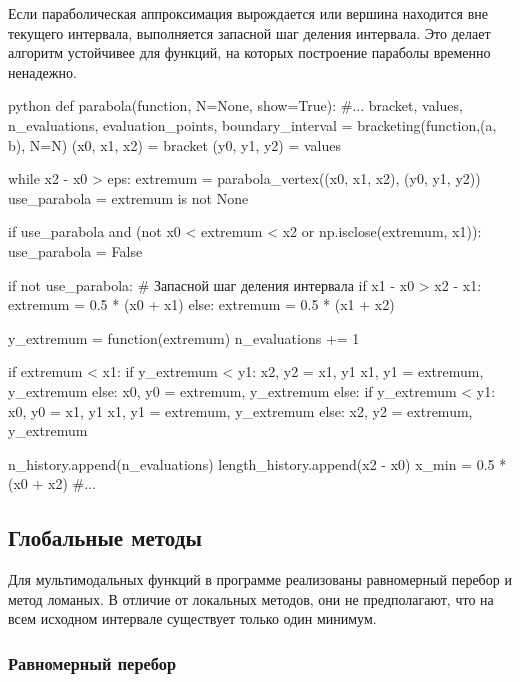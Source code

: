 Если параболическая аппроксимация вырождается или вершина находится вне текущего
интервала, выполняется запасной шаг деления интервала. Это делает алгоритм
устойчивее для функций, на которых построение параболы временно ненадежно.

\newpage

\begin{mintedbox}{python}
def parabola(function, N=None, show=True):
    #...
    bracket, values, n_evaluations, evaluation_points, boundary_interval = bracketing(function,(a, b), N=N)
    (x0, x1, x2) = bracket
    (y0, y1, y2) = values

    while x2 - x0 > eps:
        extremum = parabola_vertex((x0, x1, x2), (y0, y1, y2))
        use_parabola = extremum is not None

        if use_parabola and (not x0 < extremum < x2 or np.isclose(extremum, x1)):
            use_parabola = False

        if not use_parabola: # Запасной шаг деления интервала
            if x1 - x0 > x2 - x1:
                extremum = 0.5 * (x0 + x1)
            else:
                extremum = 0.5 * (x1 + x2)

        y_extremum = function(extremum)
        n_evaluations += 1

        if extremum < x1:
            if y_extremum < y1:
                x2, y2 = x1, y1
                x1, y1 = extremum, y_extremum
            else:
                x0, y0 = extremum, y_extremum
        else:
            if y_extremum < y1:
                x0, y0 = x1, y1
                x1, y1 = extremum, y_extremum
            else:
                x2, y2 = extremum, y_extremum

        n_history.append(n_evaluations)
        length_history.append(x2 - x0)
    x_min = 0.5 * (x0 + x2)
    #...
\end{mintedbox}

\subsection{Глобальные методы}

Для мультимодальных функций в программе реализованы равномерный перебор
и метод ломаных. В отличие от локальных методов, они не предполагают, что
на всем исходном интервале существует только один минимум.

\subsubsection{Равномерный перебор}

